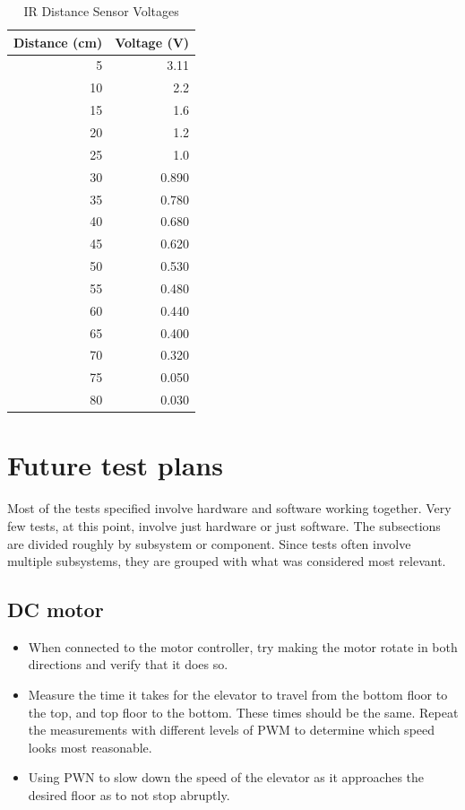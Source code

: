 \documentclass{article}
\begin{document}
    \begin{table}[h!]
  	    \begin{center}
            \caption{IR Distance Sensor Voltages}
    		\label{tab:table2}
    		\begin{tabular}{r|r}
      			\textbf{Distance (cm)} & \textbf{Voltage (V)} \\
			    \hline
      			5 & 3.11\\
      			10 & 2.2\\
      			15 & 1.6\\
      			20 & 1.2\\
				25 & 1.0\\
				30 & 0.890 \\
				35 & 0.780 \\
				40 & 0.680 \\
				45 & 0.620 \\
				50 & 0.530 \\
				55 & 0.480 \\
				60 & 0.440 \\
				65 & 0.400 \\
				70 & 0.320 \\
				75 & 0.050 \\
				80 & 0.030 \\
   			\end{tabular}
  	    \end{center}
	\end{table}
	
	
	\section{Future test plans}
	Most of the tests specified involve hardware and software working together. Very few tests, at this point, involve just hardware or just software. The subsections are divided roughly by subsystem or component. Since tests often involve multiple subsystems, they are grouped with what was considered most relevant.
	    \subsection{DC motor}
	    \begin{itemize}
            \item When connected to the motor controller, try making the motor rotate in both directions and verify that it does so.
            \item Measure the time it takes for the elevator to travel from the bottom floor to the top, and top floor to the bottom. These times should be the same. Repeat the measurements with different levels of PWM to determine which speed looks most reasonable.
            \item Using PWN to slow down the speed of the elevator as it approaches the desired floor as to not stop abruptly.  
        \end{itemize}
        
\end{document}
